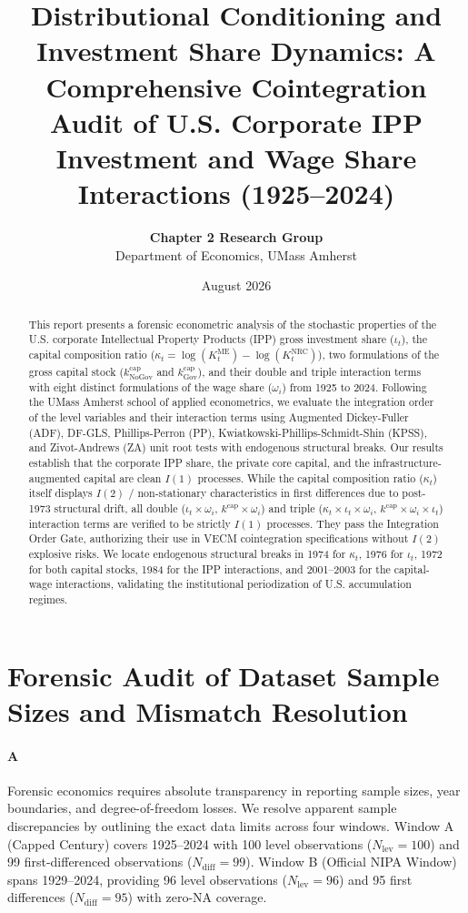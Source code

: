 \documentclass[11pt,a4paper]{article}
\title{\textbf{Distributional Conditioning and Investment Share Dynamics: A Comprehensive Cointegration Audit of U.S. Corporate IPP Investment and Wage Share Interactions (1925--2024)}}
\author{\textbf{Chapter 2 Research Group} \\ Department of Economics, UMass Amherst}
\date{August 2026}
\begin{document}
\maketitle

\begin{abstract}
This report presents a forensic econometric analysis of the stochastic properties of the U.S. corporate Intellectual Property Products (IPP) gross investment share ($\iota_t$), the capital composition ratio ($\kappa_t = \log(K^{\text{ME}}_t) - \log(K^{\text{NRC}}_t)$), two formulations of the gross capital stock ($k^{\text{cap}}_{\text{NoGov}}$ and $k^{\text{cap}}_{\text{Gov}}$), and their double and triple interaction terms with eight distinct formulations of the wage share ($\omega_i$) from 1925 to 2024. Following the UMass Amherst school of applied econometrics, we evaluate the integration order of the level variables and their interaction terms using Augmented Dickey-Fuller (ADF), DF-GLS, Phillips-Perron (PP), Kwiatkowski-Phillips-Schmidt-Shin (KPSS), and Zivot-Andrews (ZA) unit root tests with endogenous structural breaks. Our results establish that the corporate IPP share, the private core capital, and the infrastructure-augmented capital are clean $I(1)$ processes. While the capital composition ratio ($\kappa_t$) itself displays $I(2)$ / non-stationary characteristics in first differences due to post-1973 structural drift, all double ($\iota_t \times \omega_i$, $k^{\text{cap}} \times \omega_i$) and triple ($\kappa_t \times \iota_t \times \omega_i$, $k^{\text{cap}} \times \omega_i \times \iota_t$) interaction terms are verified to be strictly $I(1)$ processes. They pass the Integration Order Gate, authorizing their use in VECM cointegration specifications without $I(2)$ explosive risks. We locate endogenous structural breaks in 1974 for $\kappa_t$, 1976 for $\iota_t$, 1972 for both capital stocks, 1984 for the IPP interactions, and 2001--2003 for the capital-wage interactions, validating the institutional periodization of U.S. accumulation regimes.
\end{abstract}

\FloatBarrier
\section{Forensic Audit of Dataset Sample Sizes and Mismatch Resolution}

\paragraph{A}
Forensic economics requires absolute transparency in reporting sample sizes, year boundaries, and degree-of-freedom losses. We resolve apparent sample discrepancies by outlining the exact data limits across four windows. Window A (Capped Century) covers 1925--2024 with 100 level observations ($N_{\text{lev}} = 100$) and 99 first-differenced observations ($N_{\text{diff}} = 99$). Window B (Official NIPA Window) spans 1929--2024, providing 96 level observations ($N_{\text{lev}} = 96$) and 95 first differences ($N_{\text{diff}} = 95$) with zero-NA coverage.
\end{document}
